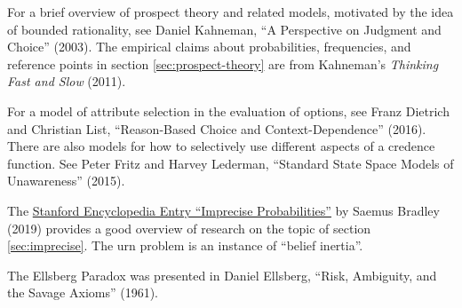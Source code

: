 \begin{sources}
  For a brief overview of prospect theory and related models, motivated by the
  idea of bounded rationality, see Daniel Kahneman, ``A Perspective on Judgment
  and Choice'' (2003). The empirical claims about probabilities, frequencies,
  and reference points in section \ref{sec:prospect-theory} are from Kahneman's
  \emph{Thinking Fast and Slow} (2011).

  For a model of attribute selection in the evaluation of options, see Franz
  Dietrich and Christian List, ``Reason-Based Choice and Context-Dependence''
  (2016).
  There are also models for how to selectively use different aspects of a
  credence function. See Peter Fritz and Harvey Lederman, ``Standard State Space
  Models of Unawareness'' (2015).

  
  The
  \href{https://plato.stanford.edu/entries/imprecise-probabilities/}{Stanford Encyclopedia Entry ``Imprecise Probabilities''}
  by Saemus Bradley (2019) provides a good overview of research on the topic of
  section \ref{sec:imprecise}. The urn problem is an instance of ``belief
  inertia''.

  The Ellsberg Paradox was presented in Daniel Ellsberg, ``Risk, Ambiguity, and
  the Savage Axioms'' (1961).

\end{sources}




